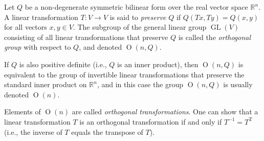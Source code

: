 \documentclass[12pt]{article}
\begin{document}
Let $Q$ be a non-degenerate symmetric bilinear form over the real vector space $\mathbb{R}^n$. A linear transformation $T\colon V \to V$ is said to \emph{preserve} $Q$ if $Q(Tx,Ty) = Q(x,y)$ for all vectors $x,y \in V$. The subgroup of the general linear group $\operatorname{GL}(V)$ consisting of all linear transformations that preserve $Q$ is called the \emph{orthogonal group} with respect to $Q$, and denoted  $\operatorname{O}(n,Q)$.

If $Q$ is also positive definite (i.e., $Q$ is an inner product), then $\operatorname{O}(n,Q)$ is equivalent to the group of invertible linear transformations that preserve the standard inner product on $\mathbb{R}^n$, and in this case the group $\operatorname{O}(n,Q)$ is usually denoted $\operatorname{O}(n)$.

Elements of $\operatorname{O}(n)$ are called \emph{orthogonal transformations}. 
One can show that a linear transformation $T$ is an orthogonal transformation if and only if $T^{-1} = T^{\operatorname{T}}$ (i.e., the inverse of $T$ equals the transpose of $T$).
\end{document}
